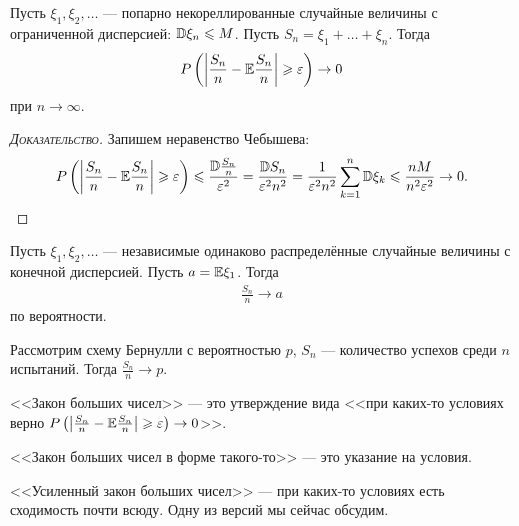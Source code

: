 \documentclass[../main.tex]{subfiles}
\begin{document}
\begin{thm}
 Пусть $ \xi_1, \xi_2, \ldots $ --- попарно некореллированные случайные величины с ограниченной дисперсией: $ \mathbb D \xi_n \leqslant M $. Пусть $ S_n = \xi_1 + \ldots + \xi_n $. Тогда
 \begin{align*}
  P\left(\left| \frac{S_n}{n} - \mathbb E \frac{S_n}{n} \right| \geqslant \varepsilon\right) \to 0
 \end{align*} при $ n \to \infty $.
\end{thm}
\begin{proof}[\normalfont\textsc{Доказательство}]
 Запишем неравенство Чебышева:
 \begin{align*}
  P \left( \left| \frac{S_n}{n} - \mathbb E \frac{S_n}{n} \right| \geqslant \varepsilon \right) \leqslant \frac{\mathbb D \frac{S_n}{n}}{\varepsilon ^{ 2}} = \frac{\mathbb D S_n}{\varepsilon^{2} n^{2}} = \frac{1}{\varepsilon^{2} n^{2}} \sum_{k=1}^{n}\mathbb D\xi_k \leqslant \frac{nM}{n^{2}\varepsilon^{2}} \to 0.
 \end{align*}
\end{proof}

\begin{crly}
 Пусть $ \xi_1, \xi_2, \ldots $  --- независимые одинаково распределённые случайные величины с конечной дисперсией. Пусть $ a = \mathbb E \xi_1 $. Тогда
 \begin{align*}
  \frac{S_n}{n} \to a
 \end{align*} по вероятности.
\end{crly}

\begin{crly}
 Рассмотрим схему Бернулли с вероятностью $ p $, $ S_n $ --- количество успехов среди $ n $ испытаний. Тогда $ \frac{S_n}{n} \to p $.
\end{crly}

\begin{conventn*}
 <<Закон больших чисел>> --- это утверждение вида <<при каких-то условиях верно $ P \left( \left| \frac{S_n}{n} - \mathbb E \frac{S_n}{n} \right| \geqslant \varepsilon \right) \to 0 $>>.

 <<Закон больших чисел в форме такого-то>> --- это указание на условия.

 <<Усиленный закон больших чисел>> --- при каких-то условиях есть сходимость почти всюду. Одну из версий мы сейчас обсудим.
\end{conventn*}
\end{document}
